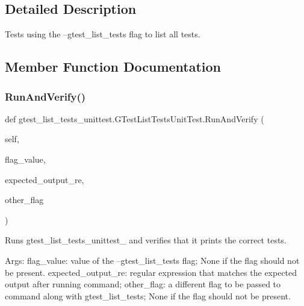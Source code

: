 \subsection{Detailed Description}
\begin{DoxyVerb}Tests using the --gtest_list_tests flag to list all tests.\end{DoxyVerb}
 

\subsection{Member Function Documentation}
\mbox{\label{classgtest__list__tests__unittest_1_1_g_test_list_tests_unit_test_a965601cd1882fdeca94d2461bd033c40}} 
\subsubsection{\texorpdfstring{Run\+And\+Verify()}{RunAndVerify()}}
{\footnotesize\ttfamily def gtest\+\_\+list\+\_\+tests\+\_\+unittest.\+G\+Test\+List\+Tests\+Unit\+Test.\+Run\+And\+Verify (\begin{DoxyParamCaption}\item[{}]{self,  }\item[{}]{flag\+\_\+value,  }\item[{}]{expected\+\_\+output\+\_\+re,  }\item[{}]{other\+\_\+flag }\end{DoxyParamCaption})}

\begin{DoxyVerb}Runs gtest_list_tests_unittest_ and verifies that it prints
the correct tests.

Args:
  flag_value:         value of the --gtest_list_tests flag;
                  None if the flag should not be present.
  expected_output_re: regular expression that matches the expected
                  output after running command;
  other_flag:         a different flag to be passed to command
                  along with gtest_list_tests;
                  None if the flag should not be present.
\end{DoxyVerb}
 \mbox{\label{classgtest__list__tests__unittest_1_1_g_test_list_tests_unit_test_a4168d086b7ec31f86ab548b6fd79b27e}} 

